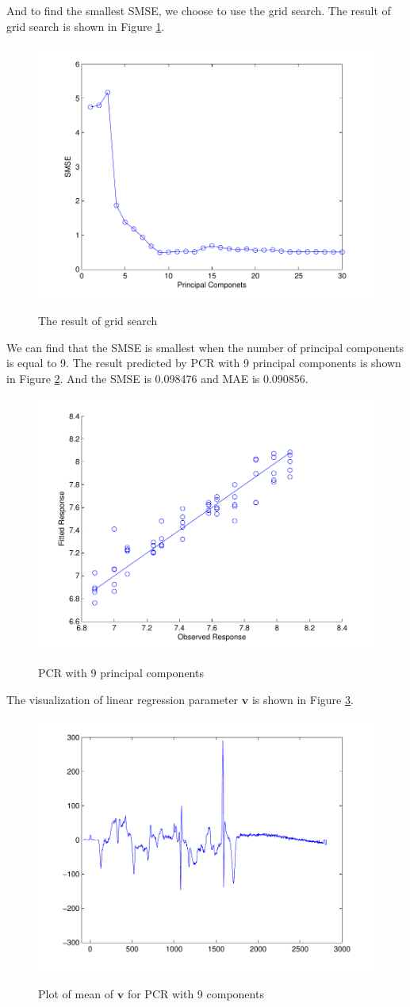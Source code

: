 \documentclass[a4paper]{article}
\newcommand{\bfv}{\mathbf{v}}
\begin{document}
And to find the smallest SMSE, we choose to use the grid search. The result of grid search is shown in Figure \ref{pcrb2}.
\begin{figure}[h]
  \centering
  \includegraphics[width=.6\textwidth]{images/gsearch_PCR.pdf}\\
  \caption{The result of grid search}\label{pcrb2}
\end{figure}

\newpage
We can find that the SMSE is smallest when the number of principal components is equal to 9. The result predicted by PCR with 9 principal components is shown in Figure \ref{pic4}. And the SMSE is 0.098476 and MAE is 0.090856.
\begin{figure}[h]
  \centering
  \includegraphics[width=.6\textwidth]{images/predict_PCR.pdf}\\
  \caption{PCR with 9 principal components}\label{pic4}
\end{figure}

The visualization of linear regression parameter $\bfv$ is shown in Figure \ref{pic5}.
\begin{figure}[h]
  \centering
  \includegraphics[width=.6\textwidth]{images/v_PCR.pdf}\\
  \caption{Plot of mean of $\bfv$ for PCR with 9 components}\label{pic5}
\end{figure}
\end{document}

